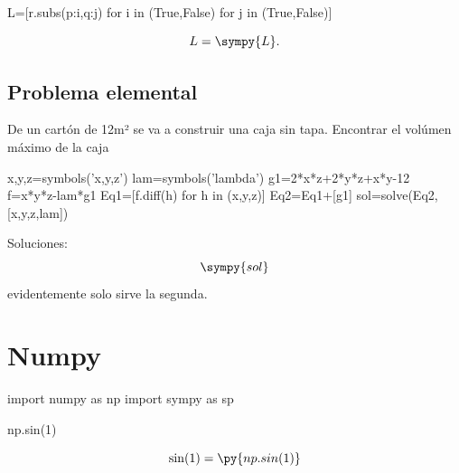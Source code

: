 \begin{sympyblock}
L=[r.subs({p:i,q:j}) for i in (True,False) for j in (True,False)]
\end{sympyblock}

$$L=\sympy{L}.$$

\subsection{Problema elemental}

De un cartón de 12m² se va a construir una caja sin tapa. Encontrar el volúmen máximo de la caja 
\begin{sympyblock}
x,y,z=symbols('x,y,z')
lam=symbols('lambda')
g1=2*x*z+2*y*z+x*y-12
f=x*y*z-lam*g1
Eq1=[f.diff(h) for h in (x,y,z)]
Eq2=Eq1+[g1]
sol=solve(Eq2,[x,y,z,lam])
\end{sympyblock}
Soluciones:
$$\sympy{sol}$$
evidentemente solo sirve la segunda.



\section{Numpy}



\begin{pyblock}
import numpy as np
import sympy as sp
\end{pyblock}




\begin{pyblock}
np.sin(1)
\end{pyblock}

 
$$\sin(1)=\py{np.sin(1)}$$
 











\nocite{HansPetterLangtangen1344,AmitSaha1345,WesMcKinney1347,IvanIdris1348, RonanLamy1349,IvanIdris1350, MarkSummerfield1351,PeterFarrell1353}
